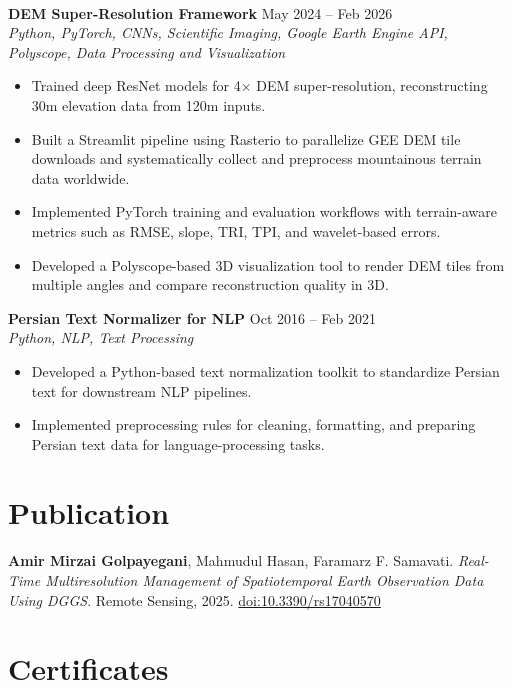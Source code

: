 \documentclass[a4paper,10pt]{article}
\begin{document}
\noindent \\
\textbf{DEM Super-Resolution Framework} \hfill May 2024 -- Feb 2026 \\
\textit{Python, PyTorch, CNNs, Scientific Imaging, Google Earth Engine API, Polyscope, Data Processing and Visualization}
\begin{itemize}[leftmargin=0.25in]
    \item Trained deep ResNet models for 4$\times$ DEM super-resolution, reconstructing 30m elevation data from 120m inputs.
    \item Built a Streamlit pipeline using Rasterio to parallelize GEE DEM tile downloads and systematically collect and preprocess mountainous terrain data worldwide.
    \item Implemented PyTorch training and evaluation workflows with terrain-aware metrics such as RMSE, slope, TRI, TPI, and wavelet-based errors.
    \item Developed a Polyscope-based 3D visualization tool to render DEM tiles from multiple angles and compare reconstruction quality in 3D.
\end{itemize}

\noindent
\textbf{Persian Text Normalizer for NLP} \hfill Oct 2016 -- Feb 2021 \\
\textit{Python, NLP, Text Processing}
\begin{itemize}[leftmargin=0.25in]
    \item Developed a Python-based text normalization toolkit to standardize Persian text for downstream NLP pipelines.
    \item Implemented preprocessing rules for cleaning, formatting, and preparing Persian text data for language-processing tasks.
\end{itemize}

\section*{Publication}

\textbf{Amir Mirzai Golpayegani}, Mahmudul Hasan, Faramarz F. Samavati.
\textit{Real-Time Multiresolution Management of Spatiotemporal Earth Observation Data Using DGGS}.
Remote Sensing, 2025. \href{https://doi.org/10.3390/rs17040570}{doi:10.3390/rs17040570}


\section*{Certificates}
\end{document}
